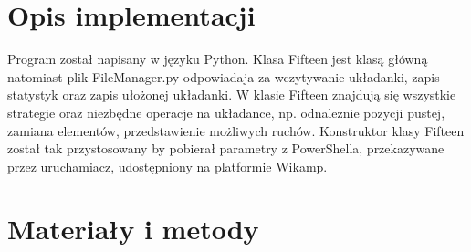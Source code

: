 \documentclass{classrep}
\begin{document}
\section{Opis implementacji}
{
Program został napisany w języku Python. Klasa Fifteen jest klasą główną natomiast plik FileManager.py odpowiadaja za wczytywanie układanki, zapis statystyk oraz zapis ułożonej układanki. W klasie Fifteen znajdują się wszystkie strategie oraz niezbędne operacje na układance, np. odnaleznie pozycji pustej, zamiana elementów, przedstawienie możliwych ruchów. Konstruktor klasy Fifteen został tak przystosowany by pobierał parametry z PowerShella, przekazywane przez uruchamiacz, udostępniony na platformie Wikamp.
}

\section{Materiały i metody}
\end{document}
